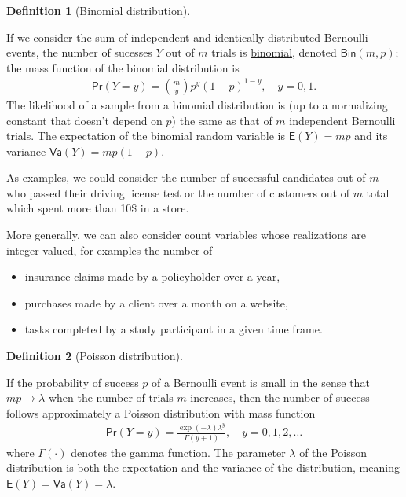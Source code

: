 \documentclass[
  11pt,
  letterpaper,
]{scrbook}
\providecommand{\tightlist}{%
  \setlength{\itemsep}{0pt}\setlength{\parskip}{0pt}}\usepackage{longtable,booktabs,array}
\theoremstyle{definition}
\newtheorem{definition}{Definition}[chapter]
\theoremstyle{definition}
\theoremstyle{plain}
\theoremstyle{remark}
\begin{document}
\begin{definition}[Binomial
distribution]\protect\hypertarget{def-binomialdist}{}\label{def-binomialdist}

If we consider the sum of independent and identically distributed
Bernoulli events, the number of sucesses \(Y\) out of \(m\) trials is
\href{https://en.wikipedia.org/wiki/Binomial_distribution}{binomial},
denoted \(\mathsf{Bin}(m, p)\); the mass function of the binomial
distribution is \begin{align*}
\mathsf{Pr}(Y=y) = \binom{m}{y}p^y (1-p)^{1-y}, \quad y=0, 1.
\end{align*} The likelihood of a sample from a binomial distribution is
(up to a normalizing constant that doesn't depend on \(p\)) the same as
that of \(m\) independent Bernoulli trials. The expectation of the
binomial random variable is \(\mathsf{E}(Y)=mp\) and its variance
\(\mathsf{Va}(Y)=mp(1-p).\)

\end{definition}

As examples, we could consider the number of successful candidates out
of \(m\) who passed their driving license test or the number of
customers out of \(m\) total which spent more than 10\$ in a store.

More generally, we can also consider count variables whose realizations
are integer-valued, for examples the number of

\begin{itemize}
\tightlist
\item
  insurance claims made by a policyholder over a year,
\item
  purchases made by a client over a month on a website,
\item
  tasks completed by a study participant in a given time frame.
\end{itemize}

\begin{definition}[Poisson
distribution]\protect\hypertarget{def-poissondist}{}\label{def-poissondist}

If the probability of success \(p\) of a Bernoulli event is small in the
sense that \(mp \to \lambda\) when the number of trials \(m\) increases,
then the number of success follows approximately a Poisson distribution
with mass function \begin{align*}
\mathsf{Pr}(Y=y) = \frac{\exp(-\lambda)\lambda^y}{\Gamma(y+1)}, \quad y=0, 1, 2, \ldots
\end{align*} where \(\Gamma(\cdot)\) denotes the gamma function. The
parameter \(\lambda\) of the Poisson distribution is both the
expectation and the variance of the distribution, meaning
\(\mathsf{E}(Y)=\mathsf{Va}(Y)=\lambda.\)

\end{definition}
\end{document}
